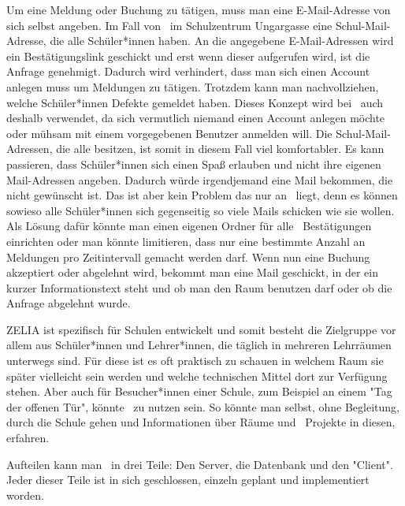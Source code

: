 Um eine Meldung oder Buchung zu tätigen, muss man eine E-Mail-Adresse von sich selbst angeben. Im Fall von \ZELIA\ im Schulzentrum Ungargasse eine Schul-Mail-Adresse, die alle Schüler*innen haben. An die angegebene E-Mail-Adressen wird ein Bestätigungslink geschickt und erst wenn dieser aufgerufen wird, ist die Anfrage genehmigt. Dadurch wird verhindert, dass man sich einen Account anlegen muss um Meldungen zu tätigen. Trotzdem kann man nachvollziehen, welche Schüler*innen Defekte gemeldet haben. Dieses Konzept wird bei \ZELIA\ auch deshalb verwendet, da sich vermutlich niemand einen Account anlegen möchte oder mühsam mit einem vorgegebenen Benutzer anmelden will. Die Schul-Mail-Adressen, die alle besitzen, ist somit in diesem Fall viel komfortabler. Es kann passieren, dass Schüler*innen sich einen Spaß erlauben und nicht ihre eigenen Mail-Adressen angeben. Dadurch würde irgendjemand eine Mail bekommen, die nicht gewünscht ist. Das ist aber kein Problem das nur an \ZELIA\ liegt, denn es können sowieso alle Schüler*innen sich gegenseitig so viele Mails schicken wie sie wollen. Als Lösung dafür könnte man einen eigenen Ordner für alle \ZELIA\ Bestätigungen einrichten oder man könnte limitieren, dass nur eine bestimmte Anzahl an Meldungen pro Zeitintervall gemacht werden darf. Wenn nun eine Buchung akzeptiert oder abgelehnt wird, bekommt man eine Mail geschickt, in der ein kurzer Informationstext steht und ob man den Raum benutzen darf oder ob die Anfrage abgelehnt wurde.

ZELIA ist spezifisch für Schulen entwickelt und somit besteht die Zielgruppe vor allem aus Schüler*innen und Lehrer*innen, die täglich in mehreren Lehrräumen unterwegs sind. Für diese ist es oft praktisch zu schauen in welchem Raum sie später vielleicht sein werden und welche technischen Mittel dort zur Verfügung stehen. Aber auch für Besucher*innen einer Schule, zum Beispiel an einem "Tag der offenen Tür", könnte \ZELIA\ zu nutzen sein. So könnte man selbst, ohne Begleitung, durch die Schule gehen und Informationen über Räume und \zb\ Projekte in diesen, erfahren.

Aufteilen kann man \ZELIA\ in drei Teile: Den Server, die Datenbank und den "Client". Jeder dieser Teile ist in sich geschlossen, einzeln geplant und implementiert worden.

